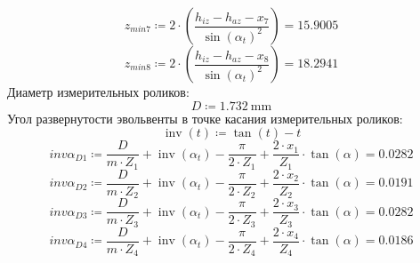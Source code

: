 \documentclass{article}
\newcommand{\defeq}{\coloneq} %
\begin{document}
\begin{equation*}
\textit{z}_{\textit{min7}} \defeq 2 \cdot \left( \frac{h_{iz}-h_{az}-\textit{x}_{\textit{7}}}{\sin \left( α_{t} \right)^{2}} \right) = {15.9005}
\end{equation*}
\begin{equation*}
\textit{z}_{\textit{min8}} \defeq 2 \cdot \left( \frac{h_{iz}-h_{az}-\textit{x}_{\textit{8}}}{\sin \left( α_{t} \right)^{2}} \right) = {18.2941}
\end{equation*}
\colorbox[HTML]{000000}{Диаметр измерительных роликов:}\newline
\begin{equation*}
D \defeq 1.732 \: \mathrm{mm}
\end{equation*}
\colorbox[HTML]{000000}{Угол развернутости эвольвенты в точке касания измерительных роликов:}\newline
\begin{equation*}
\operatorname{inv} \left( t \right) \defeq \tan \left( t \right)-t
\end{equation*}
\begin{equation*}
\textit{invα}_{\textit{D1}} \defeq \frac{D}{m \cdot \textit{Z}_{\textit{1}}}+\operatorname{inv} \left( α_{t} \right)-\frac{{\pi}}{2 \cdot \textit{Z}_{\textit{1}}}+\frac{2 \cdot \textit{x}_{\textit{1}}}{\textit{Z}_{\textit{1}}} \cdot \tan \left( {\alpha} \right) = {0.0282}
\end{equation*}
\begin{equation*}
\textit{invα}_{\textit{D2}} \defeq \frac{D}{m \cdot \textit{Z}_{\textit{2}}}+\operatorname{inv} \left( α_{t} \right)-\frac{{\pi}}{2 \cdot \textit{Z}_{\textit{2}}}+\frac{2 \cdot \textit{x}_{\textit{2}}}{\textit{Z}_{\textit{2}}} \cdot \tan \left( {\alpha} \right) = {0.0191}
\end{equation*}
\begin{equation*}
\textit{invα}_{\textit{D3}} \defeq \frac{D}{m \cdot \textit{Z}_{\textit{3}}}+\operatorname{inv} \left( α_{t} \right)-\frac{{\pi}}{2 \cdot \textit{Z}_{\textit{3}}}+\frac{2 \cdot \textit{x}_{\textit{3}}}{\textit{Z}_{\textit{3}}} \cdot \tan \left( {\alpha} \right) = {0.0282}
\end{equation*}
\begin{equation*}
\textit{invα}_{\textit{D4}} \defeq \frac{D}{m \cdot \textit{Z}_{\textit{4}}}+\operatorname{inv} \left( α_{t} \right)-\frac{{\pi}}{2 \cdot \textit{Z}_{\textit{4}}}+\frac{2 \cdot \textit{x}_{\textit{4}}}{\textit{Z}_{\textit{4}}} \cdot \tan \left( {\alpha} \right) = {0.0186}
\end{equation*}
\end{document}
